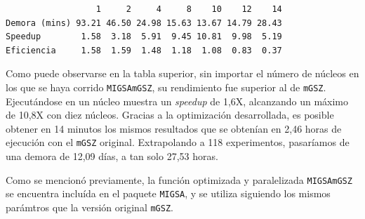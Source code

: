 \documentclass[12pt,twoside]{reedthesis}
\newenvironment{Shaded}{\begin{snugshade}}{\end{snugshade}}
\newcommand{\CommentTok}[1]{\textcolor[rgb]{0.56,0.35,0.01}{\textit{#1}}}
\newcommand{\ControlFlowTok}[1]{\textcolor[rgb]{0.13,0.29,0.53}{\textbf{#1}}}
\newcommand{\DataTypeTok}[1]{\textcolor[rgb]{0.13,0.29,0.53}{#1}}
\newcommand{\DecValTok}[1]{\textcolor[rgb]{0.00,0.00,0.81}{#1}}
\newcommand{\KeywordTok}[1]{\textcolor[rgb]{0.13,0.29,0.53}{\textbf{#1}}}
\newcommand{\NormalTok}[1]{#1}
\newcommand{\OperatorTok}[1]{\textcolor[rgb]{0.81,0.36,0.00}{\textbf{#1}}}
\newcommand{\StringTok}[1]{\textcolor[rgb]{0.31,0.60,0.02}{#1}}
\begin{document}
\begin{Shaded}
\end{Shaded}
\begin{verbatim}
                  1     2     4     8    10    12    14
Demora (mins) 93.21 46.50 24.98 15.63 13.67 14.79 28.43
Speedup        1.58  3.18  5.91  9.45 10.81  9.98  5.19
Eficiencia     1.58  1.59  1.48  1.18  1.08  0.83  0.37
\end{verbatim}
\par

Como puede observarse en la tabla superior, sin importar el número de núcleos en los que se haya corrido \texttt{MIGSAmGSZ}, su rendimiento fue superior al de \texttt{mGSZ}. Ejecutándose en un núcleo muestra un \emph{speedup} de 1,6X, alcanzando un máximo de 10,8X con diez núcleos. Gracias a la optimización desarrollada, es posible obtener en 14 minutos los mismos resultados que se obtenían en 2,46 horas de ejecución con el \texttt{mGSZ} original. Extrapolando a 118 experimentos, pasaríamos de una demora de 12,09 días, a tan solo 27,53 horas.

\par

Como se mencionó previamente, la función optimizada y paralelizada \texttt{MIGSAmGSZ} se encuentra incluída en el paquete \texttt{MIGSA}, y se utiliza siguiendo los mismos parámtros que la versión original \texttt{mGSZ}.
\end{document}
